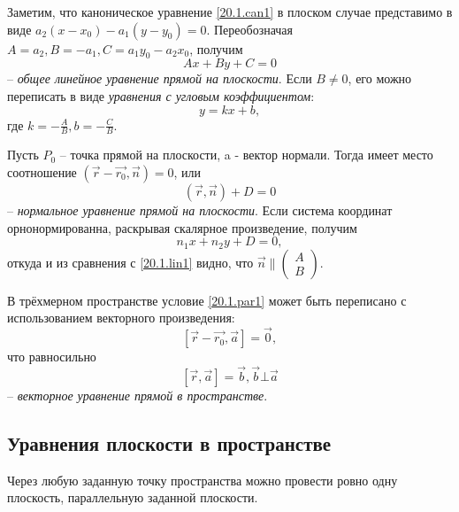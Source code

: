   Заметим, что каноническое уравнение \ref{20.1.can1} в плоском случае представимо в виде $a_2(x-x_0)-a_1(y-y_0)=0$. Переобозначая $A=a_2, B=-a_1, C=a_1y_0-a_2x_0$, получим
  \begin{equation}\label{20.1.lin1}
  Ax+By+C=0
  \end{equation}
  -- \textit{общее линейное уравнение прямой на плоскости}. Если $B\neq0$, его можно переписать в виде \textit{уравнения с угловым коэффициентом}:
  \begin{equation}\label{20.1.ang1}
  y=kx+b,
  \end{equation}
  где $k=-\frac AB, b=-\frac CB$.
    
  Пусть $P_0$ -- точка прямой на плоскости, a  - вектор нормали. Тогда имеет место соотношение $(\overrightarrow{r}-\overrightarrow{r_0},\overrightarrow{n})=0$, или
  \begin{equation}\label{20.1.norm1}
  (\overrightarrow{r},\overrightarrow{n})+D=0
  \end{equation}
  -- \textit{нормальное уравнение прямой на плоскости}. Если система координат орнонормированна, раскрывая скалярное произведение, получим
  \begin{equation}
  n_1x+n_2y+D=0,
  \end{equation}
откуда и из сравнения с \ref{20.1.lin1} видно, что $\overrightarrow{n}\parallel\left(\begin{array}{crl}
A\\
B
\end{array}\right)$.   

  В трёхмерном пространстве условие \ref{20.1.par1} может быть переписано с использованием векторного произведения:
  \begin{equation}\label{20.1.vect1}
  [\overrightarrow{r}-\overrightarrow{r_0},\overrightarrow{a}]=\overrightarrow{0}, 
  \end{equation}
  что равносильно
  \begin{equation}\label{20.1.vect1}
  [\overrightarrow{r},\overrightarrow{a}]=\overrightarrow{b}, \overrightarrow{b}\bot\overrightarrow{a}
  \end{equation}
  -- \textit{векторное уравнение прямой в пространстве}.
  
\subsection{Уравнения плоскости в пространстве}
\begin{axiome}
Через любую заданную точку пространства можно провести ровно одну плоскость, параллельную заданной плоскости.
\end{axiome}

